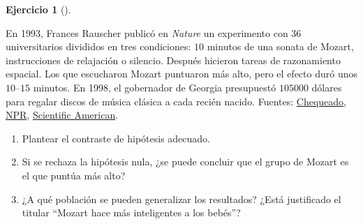 \documentclass[
  spanish,
  a4paper,
]{scrreport}
\theoremstyle{definition}
\newtheorem{exercise}{Ejercicio}[chapter]
\theoremstyle{remark}
\begin{document}
\begin{exercise}[]\protect\hypertarget{exr-interpretacion-efecto-mozart}{}\label{exr-interpretacion-efecto-mozart}

En 1993, Frances Rauscher publicó en \emph{Nature} un experimento con
\(36\) universitarios divididos en tres condiciones: \(10\) minutos de
una sonata de Mozart, instrucciones de relajación o silencio. Después
hicieron tareas de razonamiento espacial. Los que escucharon Mozart
puntuaron más alto, pero el efecto duró unos \(10\)--\(15\) minutos. En
1998, el gobernador de Georgia presupuestó \(105000\) dólares para
regalar discos de música clásica a cada recién nacido. Fuentes:
\href{https://chequeado.com/mitos-y-enganos/mozart/}{Chequeado},
\href{https://www.npr.org/2010/06/28/128104580/mozart-effect-was-just-what-we-wanted-to-hear}{NPR},
\href{https://www.scientificamerican.com/article/fact-or-fiction-babies-ex/}{Scientific
American}.

\begin{enumerate}
\def\labelenumi{\alph{enumi}.}
\item
  Plantear el contraste de hipótesis adecuado.
\item
  Si se rechaza la hipótesis nula, ¿se puede concluir que el grupo de
  Mozart es el que puntúa más alto?
\item
  ¿A qué población se pueden generalizar los resultados? ¿Está
  justificado el titular ``Mozart hace más inteligentes a los bebés''?
\end{enumerate}

\end{exercise}
\end{document}
